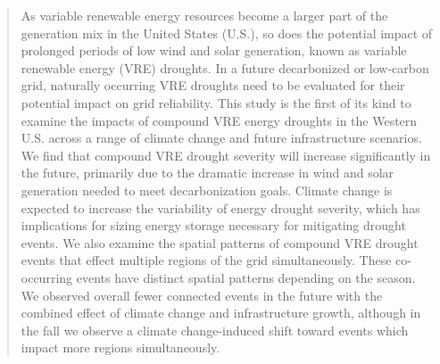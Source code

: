 \documentclass{agujournal2019}
\begin{document}
\begin{abstract}
As variable renewable energy resources become a larger part of the generation mix in the United States (U.S.), so does the potential impact of prolonged periods of low wind and solar generation, known as variable renewable energy (VRE) droughts. In a future decarbonized or low-carbon grid, naturally occurring VRE droughts need to be evaluated for their potential impact on grid reliability. This study is the first of its kind to examine the impacts of compound VRE energy droughts in the Western U.S. across a range of climate change and future infrastructure scenarios. We find that compound VRE drought severity will increase significantly in the future, primarily due to the dramatic increase in wind and solar generation needed to meet decarbonization goals. Climate change is expected to increase the variability of energy drought severity, which has implications for sizing energy storage necessary for mitigating drought events. We also examine the spatial patterns of compound VRE drought events that effect multiple regions of the grid simultaneously. These co-occurring events have distinct spatial patterns depending on the season. We observed overall fewer connected events in the future with the combined effect of climate change and infrastructure growth, although in the fall we observe a climate change-induced shift toward events which impact more regions simultaneously. 
\end{abstract}





%
%

%
\end{document}
